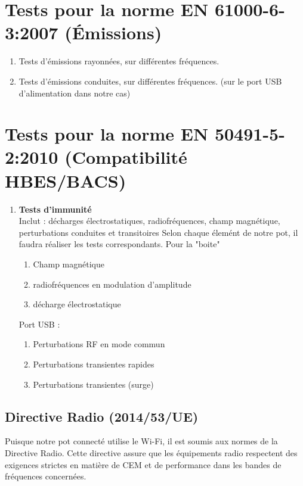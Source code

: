 \documentclass[a4paper,12pt]{article}
\begin{document}
\section{Tests pour la norme EN 61000-6-3:2007 (Émissions)}
\begin{enumerate}
    \item Tests d'émissions rayonnées, sur différentes fréquences.
    \item Tests d'émissions conduites, sur différentes fréquences. (sur le port USB d'alimentation dans notre cas)
\end{enumerate}

\section{Tests pour la norme EN 50491-5-2:2010 (Compatibilité HBES/BACS)}
\begin{enumerate}
    \item \textbf{Tests d'immunité} \\
          Inclut : décharges électrostatiques, radiofréquences, champ magnétique, perturbations conduites et transitoires
          Selon chaque élemént de notre pot, il faudra réaliser les tests correspondants.
          Pour la "boite"
          \begin{enumerate}
              \item Champ magnétique
              \item radiofréquences en modulation d'amplitude
              \item décharge électrostatique
          \end{enumerate}
          Port USB :
          \begin{enumerate}
              \item Perturbations RF en mode commun
              \item Perturbations transientes rapides
              \item Perturbations transientes (surge)
          \end{enumerate}
\end{enumerate}
\subsection{Directive Radio (2014/53/UE)}
Puisque notre pot connecté utilise le Wi-Fi, il est soumis aux normes de la Directive Radio. Cette directive assure que les équipements radio respectent des exigences strictes en matière de CEM
et de performance dans les bandes de fréquences concernées.
\end{document}
